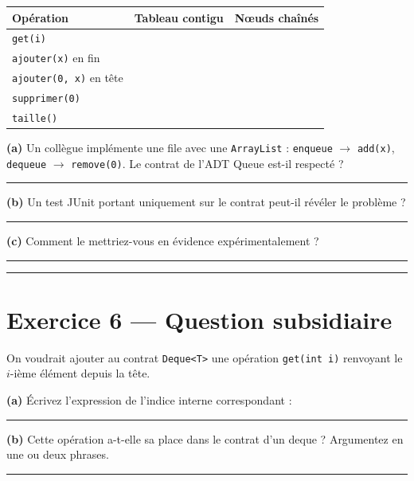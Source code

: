 \documentclass[11pt,a4paper]{article}
\newcommand{\lig}[1]{\rule{#1}{0.4pt}}
\begin{document}
\vspace{0.3cm}
\begin{center}
\begin{tabular}{lcc}
\toprule
\textbf{Opération} & \textbf{Tableau contigu} & \textbf{Nœuds chaînés} \\
\midrule
\texttt{get(i)}                & \rule{0pt}{0.7cm} & \\
\texttt{ajouter(x)} en fin     & \rule{0pt}{0.7cm} & \\
\texttt{ajouter(0, x)} en tête & \rule{0pt}{0.7cm} & \\
\texttt{supprimer(0)}          & \rule{0pt}{0.7cm} & \\
\texttt{taille()}              & \rule{0pt}{0.7cm} & \\
\bottomrule
\end{tabular}
\end{center}

\vspace{0.3cm}
\noindent\textbf{(a)} Un collègue implémente une file avec une
\texttt{ArrayList} : \texttt{enqueue} $\rightarrow$ \texttt{add(x)},
\texttt{dequeue} $\rightarrow$ \texttt{remove(0)}. Le contrat de l'ADT Queue
est-il respecté ? \lig{4cm}

\vspace{0.2cm}
\noindent\textbf{(b)} Un test JUnit portant uniquement sur le contrat
peut-il révéler le problème ? \lig{8cm}

\vspace{0.2cm}
\noindent\textbf{(c)} Comment le mettriez-vous en évidence expérimentalement ?
\lig{11cm}

\vspace{0.2cm}
\noindent\lig{14cm}

\section{Exercice 6 --- Question subsidiaire}

On voudrait ajouter au contrat \texttt{Deque<T>} une opération
\texttt{get(int i)} renvoyant le $i$-ième élément depuis la tête.

\vspace{0.2cm}
\noindent\textbf{(a)} Écrivez l'expression de l'indice interne correspondant :
\lig{7cm}

\vspace{0.2cm}
\noindent\textbf{(b)} Cette opération a-t-elle sa place dans le contrat d'un
deque ? Argumentez en une ou deux phrases. \lig{10cm}
\end{document}
